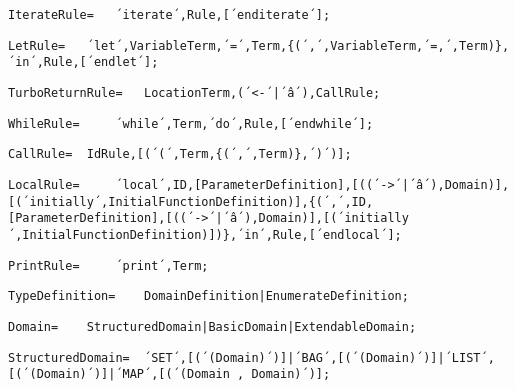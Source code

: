 \documentclass{article}
\begin{document}
    \begin{lstlisting}[mathescape=true]
     IterateRule= 	´iterate´,Rule,[´enditerate´];
    \end{lstlisting}
    
    \begin{lstlisting}[mathescape=true]
     LetRule= 	´let´,VariableTerm,´=´,Term,{(´,´,VariableTerm,´=,´,Term)},´in´,Rule,[´endlet´];
    \end{lstlisting}
    
    \begin{lstlisting}[mathescape=true]
     TurboReturnRule= 	LocationTerm,(´<-´|´â´),CallRule;
    \end{lstlisting}
    
    \begin{lstlisting}[mathescape=true]
     WhileRule= 	´while´,Term,´do´,Rule,[´endwhile´];
    \end{lstlisting}
    
    \begin{lstlisting}[mathescape=true]
     CallRule= 	IdRule,[(´(´,Term,{(´,´,Term)},´)´)];
    \end{lstlisting}
    
    \begin{lstlisting}[mathescape=true]
     LocalRule= 	´local´,ID,[ParameterDefinition],[((´->´|´â´),Domain)],[(´initially´,InitialFunctionDefinition)],{(´,´,ID,[ParameterDefinition],[((´->´|´â´),Domain)],[(´initially´,InitialFunctionDefinition)])},´in´,Rule,[´endlocal´];
    \end{lstlisting}
    
    \begin{lstlisting}[mathescape=true]
     PrintRule= 	´print´,Term;
    \end{lstlisting}
    
    \begin{lstlisting}[mathescape=true]
     TypeDefinition= 	DomainDefinition|EnumerateDefinition;
    \end{lstlisting}
    
    \begin{lstlisting}[mathescape=true]
     Domain= 	StructuredDomain|BasicDomain|ExtendableDomain;
    \end{lstlisting}
    
    \begin{lstlisting}[mathescape=true]
     StructuredDomain= 	´SET´,[(´(Domain)´)]|´BAG´,[(´(Domain)´)]|´LIST´,[(´(Domain)´)]|´MAP´,[(´(Domain , Domain)´)];
    \end{lstlisting}
    
\end{document}
